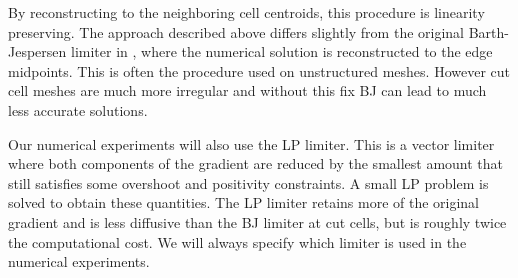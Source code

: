 By reconstructing to the neighboring cell centroids, this procedure is linearity preserving.  
The approach described above differs slightly from the original Barth-Jespersen limiter in
\cite{barth-jespersen}, where the numerical solution is reconstructed to the edge midpoints.
This is often the procedure used on unstructured meshes. However cut cell meshes are much more
irregular and without this fix BJ can lead to much less accurate solutions.

Our numerical experiments will also use the LP limiter. This is a vector limiter where both components 
of the gradient are reduced by the smallest amount that still satisfies some overshoot and positivity constraints. A small LP problem is solved to  obtain these quantities.
The LP limiter retains more of the original gradient and is less diffusive than the BJ limiter at cut cells, but is roughly twice the computational cost. We will always specify which limiter is used in the numerical experiments.  

